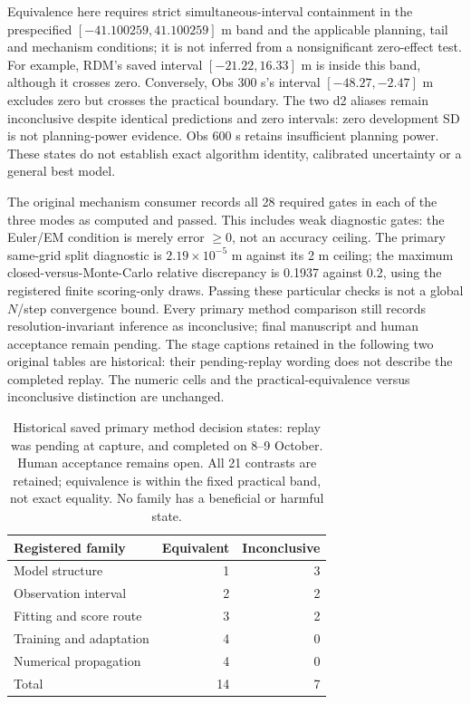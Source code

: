 Equivalence here requires strict simultaneous-interval containment in the
prespecified $[-41.100259,41.100259]$ m band and the applicable planning,
tail and mechanism conditions; it is not inferred from a nonsignificant
zero-effect test. For example, RDM's saved interval $[-21.22,16.33]$ m is
inside this band, although it crosses zero. Conversely, Obs 300 s's interval
$[-48.27,-2.47]$ m excludes zero but crosses the practical boundary.
The two d2 aliases remain inconclusive despite identical predictions and
zero intervals: zero development SD is not planning-power evidence.
Obs 600 s retains insufficient planning power. These states do not establish
exact algorithm identity, calibrated uncertainty or a general best model.

The original mechanism consumer records all 28 required gates in each of
the three modes as computed and passed. This includes weak diagnostic gates:
the Euler/EM condition is merely error $\geq0$, not an accuracy ceiling.
The primary same-grid split diagnostic is $2.19\times10^{-5}$ m against its
2 m ceiling; the maximum closed-versus-Monte-Carlo relative discrepancy is
0.1937 against 0.2, using the registered finite scoring-only draws.
Passing these particular checks is not a global $N$/step convergence bound.
Every primary method comparison still records resolution-invariant inference
as inconclusive; final manuscript and human acceptance remain pending.
The stage captions retained in the following two original tables are historical:
their pending-replay wording does not describe the completed replay. The numeric
cells and the practical-equivalence versus inconclusive distinction are unchanged.

\begin{table}[htbp]
\centering\small
\caption{Historical saved primary method decision states: replay was pending
at capture, and completed on 8--9 October. Human acceptance remains open.
All 21 contrasts are retained; equivalence is within the fixed practical
band, not exact equality. No family has a beneficial or harmful state.}
\label{tab:saved-analysis-states}\hypertarget{tab:saved-analysis-states}{}
\begin{tabular}{@{}lrr@{}}
\toprule
Registered family & Equivalent & Inconclusive\\
\midrule
Model structure & 1 & 3\\
Observation interval & 2 & 2\\
Fitting and score route & 3 & 2\\
Training and adaptation & 4 & 0\\
Numerical propagation & 4 & 0\\
Total & 14 & 7\\
\bottomrule
\end{tabular}
\end{table}

